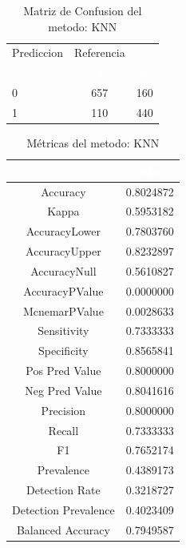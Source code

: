 \documentclass[]{article}
\begin{document}
\begin{table}[!h]

\caption{\label{tab:MatrizConf_KNN}Matriz de Confusion del metodo: KNN }
\centering
\begin{tabular}[t]{lcc}
\toprule
\multicolumn{1}{c}{Prediccion} & \multicolumn{1}{c}{Referencia} & \multicolumn{1}{c}{ } \\
\cmidrule(l{3pt}r{3pt}){1-1} \cmidrule(l{3pt}r{3pt}){2-2}
\rowcolor{black}  \multicolumn{1}{c}{\textcolor{white}{\textbf{ }}} & \multicolumn{1}{c}{\textcolor{white}{\textbf{0}}} & \multicolumn{1}{c}{\textcolor{white}{\textbf{1}}}\\
\midrule
\rowcolor{gray!6}  0 & 657 & 160\\
1 & 110 & 440\\
\bottomrule
\end{tabular}
\end{table}

\begin{table}[!h]

\caption{\label{tab:metricas_KNN}Métricas del metodo: KNN }
\centering
\begin{tabular}[t]{cc}
\toprule
\rowcolor{black}  \multicolumn{1}{c}{\textcolor{white}{\textbf{metricas}}} & \multicolumn{1}{c}{\textcolor{white}{\textbf{valor}}}\\
\midrule
\rowcolor{gray!6}  Accuracy & 0.8024872\\
Kappa & 0.5953182\\
\rowcolor{gray!6}  AccuracyLower & 0.7803760\\
AccuracyUpper & 0.8232897\\
\rowcolor{gray!6}  AccuracyNull & 0.5610827\\
\addlinespace
AccuracyPValue & 0.0000000\\
\rowcolor{gray!6}  McnemarPValue & 0.0028633\\
Sensitivity & 0.7333333\\
\rowcolor{gray!6}  Specificity & 0.8565841\\
Pos Pred Value & 0.8000000\\
\addlinespace
\rowcolor{gray!6}  Neg Pred Value & 0.8041616\\
Precision & 0.8000000\\
\rowcolor{gray!6}  Recall & 0.7333333\\
F1 & 0.7652174\\
\rowcolor{gray!6}  Prevalence & 0.4389173\\
\addlinespace
Detection Rate & 0.3218727\\
\rowcolor{gray!6}  Detection Prevalence & 0.4023409\\
Balanced Accuracy & 0.7949587\\
\bottomrule
\end{tabular}
\end{table}
\end{document}

